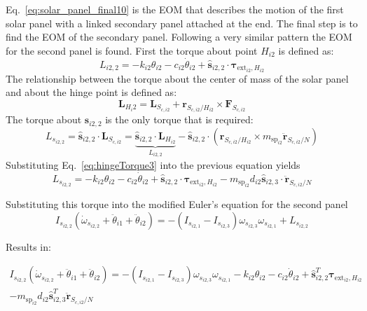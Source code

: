 \documentclass[paper]{aiaaNew}
\begin{document}
Eq.~\eqref{eq:solar_panel_final10} is the EOM that describes the motion of the first solar panel with a linked secondary panel attached at the end. The final step is to find the EOM of the secondary panel. Following a very similar pattern the EOM for the second panel is found. First the torque about point $H_{i2}$ is defined as:
	\begin{equation}
L_{i2,2} = - k_{i2} \theta_{i2} - c_{i2} \dot{\theta}_{i2} + \hat{\bm s}_{i2,2} \cdot \bm \tau_{\text{ext}_{i2},H_{i2}}
\label{eq:hingeTorque3}
\end{equation}
The relationship between the torque about the center of mass of the solar panel and about the hinge point is defined as:
\begin{equation}
\bm L_{H_i2} = \bm L_{S_{c,i2}} + \bm r_{S_{c,i2}/H_{i2}} \times \bm F_{S_{c,i2}} 
\end{equation}
The torque about $\hat{\bm s}_{i2,2}$ is the only torque that is required:
\begin{equation}
L_{s_{i2,2}} = \hat{\bm s}_{i2,2} \cdot \bm L_{S_{c,i2}} =  \underbrace{\hat{\bm s}_{i2,2} \cdot \bm L_{H_{i2}}}_{L_{i2,2}}  -  \hat{\bm s}_{i2,2} \cdot \left(
\bm r_{S_{c,i2}/H_{i2}} \times m_{\text{sp}_{i2}} \ddot{\bm r}_{S_{c,i2}/N} \right)
\end{equation}
Substituting Eq.~\eqref{eq:hingeTorque3} into the previous equation yields
\begin{equation}
L_{s_{i2,2}} = - k_{i2} \theta_{i2} - c_{i2} \dot{\theta}_{i2} + \hat{\bm s}_{i2,2} \cdot \bm \tau_{\text{ext}_{i2},H_{i2}}  -  m_{\text{sp}_{i2}} d_{i2} \hat{\bm s}_{i2,3} \cdot \ddot{\bm r}_{S_{c,i2}/N}
\end{equation}

	Substituting this torque into the modified Euler's equation for the second panel
\begin{equation}
	I_{s_{i2,2}} ( \dot\omega_{s_{i2,2}} + \ddot\theta_{i1} + \ddot\theta_{i2}) = - (I_{s_{i2,1}} - I_{s_{i2,3}}) \omega_{s_{i2,3}} \omega_{s_{i2,1}} + L_{s_{i2,2}}
\end{equation}

Results in:

\begin{multline}
	I_{s_{i2,2}} ( \dot\omega_{s_{i2,2}} + \ddot\theta_{i1} + \ddot\theta_{i2}) = - (I_{s_{i2,1}} - I_{s_{i2,3}}) \omega_{s_{i2,3}} \omega_{s_{i2,1}} - k_{i2} \theta_{i2} - c_{i2} \dot{\theta}_{i2} + \hat{\bm s}_{i2,2}^T \bm \tau_{\text{ext}_{i2},H_{i2}}  \\
	-  m_{\text{sp}_{i2}} d_{i2} \hat{\bm s}_{i2,3}^T \ddot{\bm r}_{S_{c,i2}/N}
\end{multline}
\end{document}
